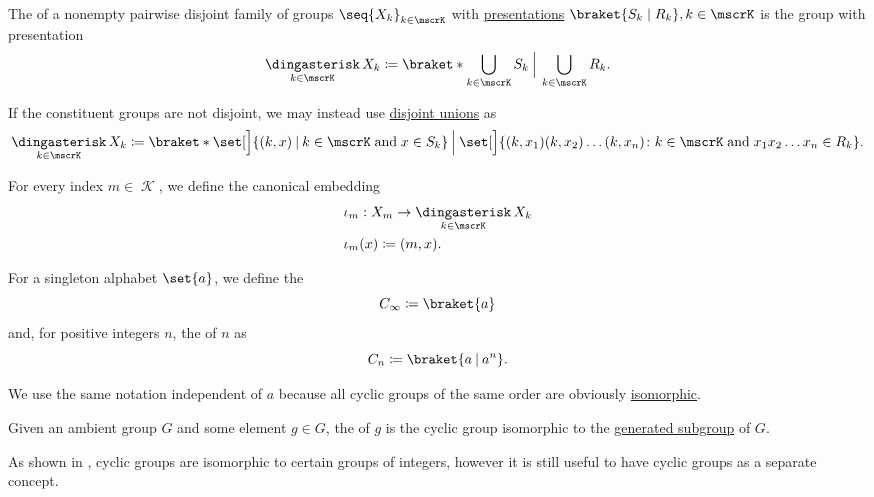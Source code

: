 \begin{definition}\label{def:group_free_product}
  The  of a nonempty pairwise disjoint family of groups \( \seq{ X_k }_{k \in \mscrK} \) with \hyperref[def:group_presentation]{presentations} \( \braket{S_k \mid R_k}, k \in \mscrK \) is the group with presentation
  \begin{equation*}
    \Ast_{k \in \mscrK} X_k \coloneqq \braket*{ \bigcup_{k \in \mscrK} S_k \given[\Big] \bigcup_{k \in \mscrK} R_k }.
  \end{equation*}

  If the constituent groups are not disjoint, we may instead use \hyperref[def:disjoint_union]{disjoint unions} as
  \small
  \begin{equation*}
    \Ast_{k \in \mscrK} X_k \coloneqq \braket*{ \set[\Big]{ (k, x) \given k \in \mscrK \T{and} x \in S_k } \given[\Big] \set[\Big]{ (k, x_1) (k, x_2) \ldots (k, x_n) \colon k \in \mscrK \T{and} x_1 x_2 \ldots x_n \in R_k } }.
  \end{equation*}
  \normalsize

  For every index \( m \in \mscrK \), we define the canonical embedding
  \begin{equation*}
    \begin{aligned}
       &\iota_m: X_m \to \Ast_{k \in \mscrK} X_k \\
       &\iota_m(x) \coloneqq (m, x).
    \end{aligned}
  \end{equation*}
\end{definition}

\begin{definition}\label{def:cyclic_group}
  For a singleton alphabet \( \set{ a } \), we define the 
  \begin{equation*}
    C_\infty \coloneqq \braket{ a }
  \end{equation*}
  and, for positive integers \( n \), the  of  \( n \) as
  \begin{equation*}
    C_n \coloneqq \braket{ a \given a^n }.
  \end{equation*}

  We use the same notation independent of \( a \) because all cyclic groups of the same order are obviously \hyperref[def:group/homomorphism]{isomorphic}.

  Given an ambient group \( G \) and some element \( g \in G \), the  of \( g \) is the cyclic group isomorphic to the \hyperref[def:group/submodel]{generated subgroup} of \( G \).

  As shown in , cyclic groups are isomorphic to certain groups of integers, however it is still useful to have cyclic groups as a separate concept.
\end{definition}

